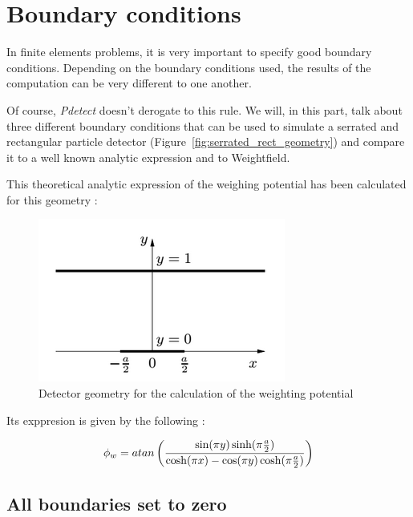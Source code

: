 \documentclass[11pt]{article}
\begin{document}

\section{Boundary conditions}

	In finite elements problems, it is very important to specify good boundary conditions.
	Depending on the boundary conditions used, the results of the computation can be very
	different to one another.

	Of course, \textit{Pdetect} doesn't derogate to this rule. We will, in this part, talk
	about three different boundary conditions that can be used to simulate a serrated and
	rectangular particle detector (Figure~\ref{fig:serrated_rect_geometry}) and compare it
	to a well known analytic expression and to Weightfield.

	This theoretical analytic expression of the weighing potential has been calculated for
	this geometry :

	\begin{figure}[H]
		\center
		\includegraphics[scale=0.5]{images/boundary_conditions/analytic.png}
		\caption{Detector geometry for the calculation of the weighting
			potential~\cite{pixeldetector}}
		\label{fig:analytic}
	\end{figure}

	Its exppresion is given by the following :

	\begin{equation}
		\phi_w = atan\left({\sin(\pi y)\sinh(\pi {a\over{2}})\over{\cosh(\pi x)-\cos(\pi y)\cosh(\pi {a\over{2}})}}\right)
		\label{analytic}
	\end{equation}

	\subsection{All boundaries set to zero}
\end{document}
